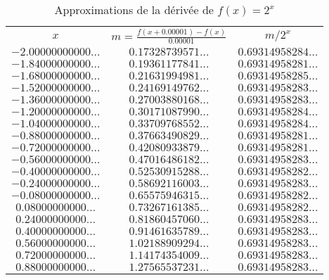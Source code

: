 \begin{table}
\caption{Approximations de la dérivée de $f(x) = 2^x$}
\label{TAB_2_EXP}
\begin{center}
\begin{tabular}{|c|c|c|}
\cline{1-3}
      $x$                               & $m = \frac{f(x+0.00001)-f(x)}{0.00001}$ &     $m/2^x$                             \\ 
\cline{1-3}
$-2.00000000000\ldots$ & $0.17328739571\ldots$ & $0.69314958284\ldots$ \\ 
$-1.84000000000\ldots$ & $0.19361177841\ldots$ & $0.69314958281\ldots$ \\ 
$-1.68000000000\ldots$ & $0.21631994981\ldots$ & $0.69314958285\ldots$ \\ 
$-1.52000000000\ldots$ & $0.24169149762\ldots$ & $0.69314958283\ldots$ \\ 
$-1.36000000000\ldots$ & $0.27003880168\ldots$ & $0.69314958283\ldots$ \\ 
$-1.20000000000\ldots$ & $0.30171087990\ldots$ & $0.69314958284\ldots$ \\ 
$-1.04000000000\ldots$ & $0.33709768552\ldots$ & $0.69314958284\ldots$ \\ 
$-0.88000000000\ldots$ & $0.37663490829\ldots$ & $0.69314958281\ldots$ \\ 
$-0.72000000000\ldots$ & $0.42080933879\ldots$ & $0.69314958281\ldots$ \\ 
$-0.56000000000\ldots$ & $0.47016486182\ldots$ & $0.69314958283\ldots$ \\ 
$-0.40000000000\ldots$ & $0.52530915288\ldots$ & $0.69314958282\ldots$ \\ 
$-0.24000000000\ldots$ & $0.58692116003\ldots$ & $0.69314958283\ldots$ \\ 
$-0.08000000000\ldots$ & $0.65575946315\ldots$ & $0.69314958282\ldots$ \\ 
$0.08000000000\ldots$ & $0.73267161385\ldots$ & $0.69314958282\ldots$ \\ 
$0.24000000000\ldots$ & $0.81860457060\ldots$ & $0.69314958283\ldots$ \\ 
$0.40000000000\ldots$ & $0.91461635789\ldots$ & $0.69314958283\ldots$ \\ 
$0.56000000000\ldots$ & $1.02188909294\ldots$ & $0.69314958283\ldots$ \\ 
$0.72000000000\ldots$ & $1.14174354009\ldots$ & $0.69314958283\ldots$ \\ 
$0.88000000000\ldots$ & $1.27565537231\ldots$ & $0.69314958283\ldots$ \\ 

\end{tabular}
\end{center}
\end{table}
